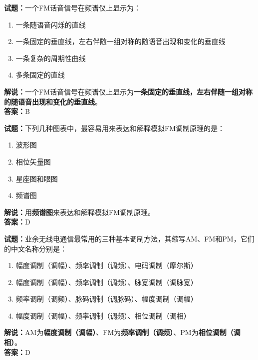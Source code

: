\documentclass{ctexbook}
\begin{document}
\bigskip


\noindent\textbf{试题：}一个FM话音信号在频谱仪上显示为：

\begin{enumerate}[leftmargin=3em]
	\item 一条随语音闪烁的直线
	\item 一条固定的垂直线，左右伴随一组对称的随语音出现和变化的垂直线
	\item 一条复杂的周期性曲线
	\item 多条固定的直线
\end{enumerate}

\noindent\textbf{解说：}一个FM话音信号在频谱仪上显示为\textbf{一条固定的垂直线，左右伴随一组对称的随语音出现和变化的垂直线}。\\\noindent\textbf{答案：}B%


\bigskip


\noindent\textbf{试题：}下列几种图表中，最容易用来表达和解释模拟FM调制原理的是：

\begin{enumerate}[leftmargin=3em]
	\item 波形图
	\item 相位矢量图
	\item 星座图和眼图
	\item 频谱图
\end{enumerate}

\noindent\textbf{解说：}用\textbf{频谱图}来表达和解释模拟FM调制原理。\\\noindent\textbf{答案：}D%


\bigskip


\noindent\textbf{试题：}业余无线电通信最常用的三种基本调制方法，其缩写AM、FM和PM，它们的中文名称分别是：

\begin{enumerate}[leftmargin=3em]
	\item 幅度调制（调幅）、频率调制（调频）、电码调制（摩尔斯）
	\item 幅度调制（调幅）、频率调制（调频）、脉宽调制（调脉宽）
	\item 频率调制（调频）、脉码调制（调脉码）、幅度调制（调幅）
	\item 幅度调制（调幅）、频率调制（调频）、相位调制（调相）
\end{enumerate}

\noindent\textbf{解说：}AM为\textbf{幅度调制（调幅）}、FM为\textbf{频率调制（调频）}、PM为\textbf{相位调制（调相）}。\\\noindent\textbf{答案：}D%
\end{document}
